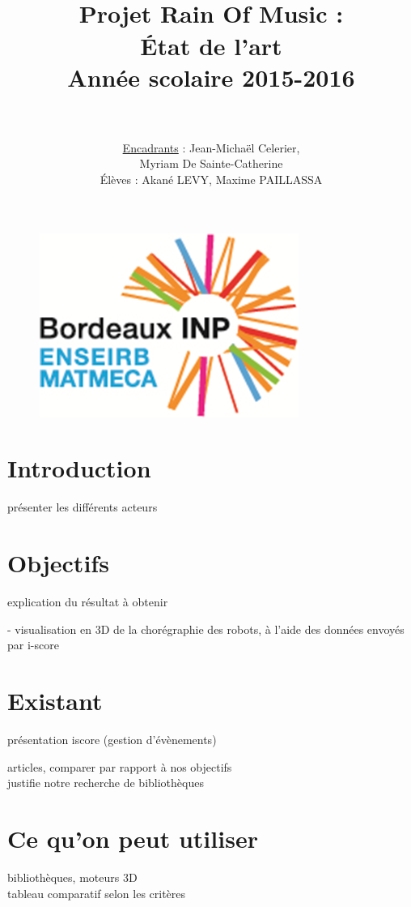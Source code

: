 \documentclass[paper=a4,12pt]{article}
\title{
  \horrule{1.5pt} \\[0.5cm]	
  \Huge \textbf{Projet Rain Of Music : \\ État de l'art} \\ [20pt]
    \LARGE Année scolaire 2015-2016 \\ 
  \horrule{1.5pt} \\[0.5cm]
}
\author{						
    \LARGE \underline{Encadrants} : Jean-Michaël Celerier, \\
   					\LARGE	\hspace{5cm} Myriam De Sainte-Catherine\\			
   	\vspace{1cm} 
   	\normalfont
   	\LARGE Élèves :  Akané LEVY, Maxime PAILLASSA    
}
\date{}
\numberwithin{equation}{section}		%
\numberwithin{figure}{section}			%
\numberwithin{table}{section}				%
\begin{document}
\graphicspath{{./imgs/}{.}}
\maketitle

\begin{figure}[H]
  \centering\includegraphics[scale=1.2]{logo_enseirb.png}
\end{figure}

\newpage

\tableofcontents

\newpage
\normalsize

\section{Introduction}
présenter les différents acteurs


\section{Objectifs}
explication du résultat à obtenir

- visualisation en 3D de la chorégraphie des robots, à l'aide des données envoyés par i-score 

\section{Existant}
présentation iscore (gestion d'évènements)



articles, comparer par rapport à nos objectifs \\
justifie notre recherche de bibliothèques



\section{Ce qu'on peut utiliser}


bibliothèques, moteurs 3D \\
tableau comparatif selon les critères
\end{document}
